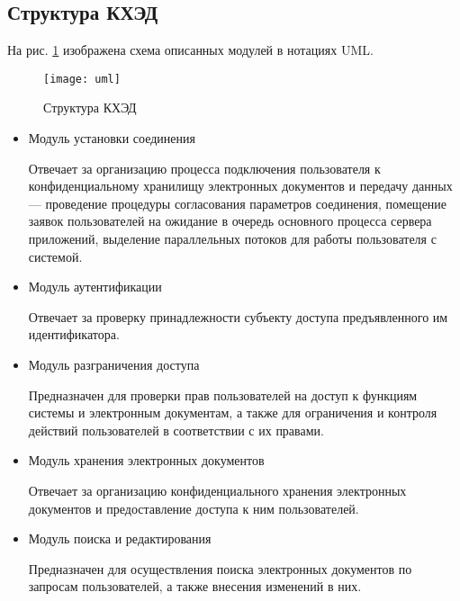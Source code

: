 \subsection{Структура КХЭД} \label{storage}

На рис. \ref{img:uml} изображена схема описанных модулей в нотациях UML.

\begin{figure}[p]
  \centering
  \texttt{[image: uml]}
  \caption{Структура КХЭД}
  \label{img:uml}
\end{figure}

\begin{itemize}
\item Модуль установки соединения

Отвечает за организацию процесса подключения пользователя к конфиденциальному хранилищу электронных документов и передачу данных --- проведение процедуры согласования параметров соединения, помещение заявок пользователей на ожидание в очередь основного процесса сервера приложений, выделение параллельных потоков для работы пользователя с системой.

\item Модуль аутентификации

Отвечает за проверку принадлежности субъекту доступа предъявленного им идентификатора.

\item Модуль разграничения доступа

Предназначен для проверки прав пользователей на доступ к функциям системы и электронным документам, а также для ограничения и контроля действий пользователей в соответствии с их правами.

\item Модуль хранения электронных документов

Отвечает за организацию конфиденциального хранения электронных документов и предоставление доступа к ним пользователей.

\item Модуль поиска и редактирования

Предназначен для осуществления поиска электронных документов по запросам пользователей, а также внесения изменений в них.

\end{itemize}
\FloatBarrier
